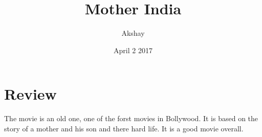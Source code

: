 \documentclass{article}
\title{Mother India}
\author{Akshay}
\date{April 2 2017}
\begin{document}
\maketitle
\section{Review}
The movie is an old one, one of the forst movies in Bollywood. It is based on the story of a mother and his son and there hard life. It is a good movie overall.
\end{document}
